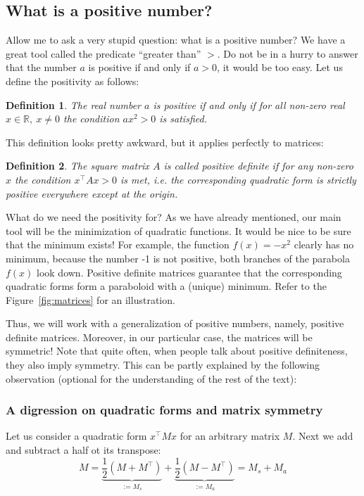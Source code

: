 \documentclass[notitlepage,oneside]{book}
\newtheorem{definition}{Definition}
\begin{document}
\subsection{What is a positive number?}
Allow me to ask a very stupid question: what is a positive number?
We have a great tool called the predicate ``greater than'' $>$.
Do not be in a hurry to answer that the number $a$ is positive if and only if $a>0$, it would be too easy. Let us define the positivity as follows:

\begin{definition}
The real number $a$ is positive if and only if for all non-zero real $x\in\mathbb R,\ x\neq 0$ the condition $ax^2>0$ is satisfied.
\end{definition}

This definition looks pretty awkward, but it applies perfectly to matrices:

\begin{definition}
The square matrix $A$ is called positive definite if for any non-zero $x$
the condition $x^\top A x > 0$ is met, i.e. the corresponding quadratic form is strictly positive everywhere except at the origin.
\end{definition}

What do we need the positivity for?
As we have already mentioned, our main tool will be the minimization of quadratic functions. 
It would be nice to be sure that the minimum exists!
For example, the function $f(x) = - x^2$ clearly has no minimum, because the number -1 is not positive, 
both branches of the parabola $f(x)$ look down.
Positive definite matrices guarantee that the corresponding quadratic forms form a paraboloid with a (unique) minimum.
Refer to the Figure~\ref{fig:matrices} for an illustration.

Thus, we will work with a generalization of positive numbers, namely, positive definite matrices. 
Moreover, in our particular case, the matrices will be symmetric!
Note that quite often, when people talk about positive definiteness, they also imply symmetry.
This can be partly explained by the following observation (optional for the understanding of the rest of the text):

\subsubsection{A digression on quadratic forms and matrix symmetry}

Let us consider a quadratic form $x^\top M x$ for an arbitrary matrix $M$. 
Next we add and subtract a half ot its transpose:
$$
M = \underbrace{\frac{1}{2} (M+M^\top)}_{:=M_s} + \underbrace{\frac{1}{2} (M-M^\top)}_{:=M_a} = M_s + M_a
$$
\end{document}
